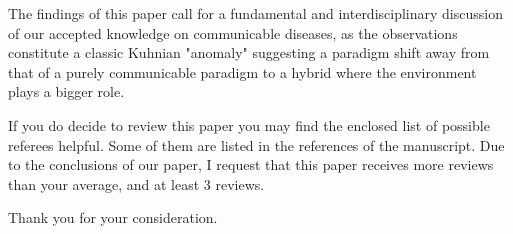 \documentclass[11pt,a4paper,roman]{moderncv}
\begin{document}
The findings of this paper call for a fundamental and interdisciplinary discussion of our accepted knowledge on communicable diseases, as the observations constitute a classic Kuhnian "anomaly" suggesting a paradigm shift away from that of a purely communicable paradigm to a hybrid where the environment plays a bigger role.

If you do decide to review this paper you may find the enclosed list of possible referees helpful. Some of them are listed in the references of the manuscript. Due to the conclusions of our paper, I request that this paper receives more reviews than your average, and at least 3 reviews. 

Thank you for your consideration.

\makeletterclosing
\newpage


\end{document}
